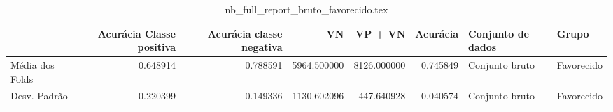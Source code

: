 \begin{table}
\centering
\caption{nb_full_report_bruto_favorecido.tex}
\label{nb_full_report_bruto_favorecido.tex}
\begin{tabular}{lrrrrrll}
\toprule
{}              &  Acurácia Classe positiva &  Acurácia classe negativa &          VN  &     VP + VN  &  Acurácia & Conjunto de dados &       Grupo \\
\midrule
Média dos Folds &                  0.648914 &                  0.788591 &  5964.500000 &  8126.000000 &  0.745849 &    Conjunto bruto &  Favorecido \\
Desv. Padrão    &                  0.220399 &                  0.149336 &  1130.602096 &   447.640928 &  0.040574 &    Conjunto bruto &  Favorecido \\
\bottomrule
\end{tabular}
\end{table}
